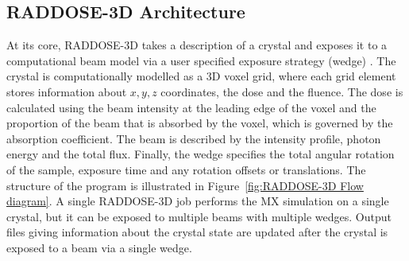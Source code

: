 \subsection{RADDOSE-3D Architecture}
\label{sub:RADDOSE-3D Architecture}
At its core, RADDOSE-3D takes a description of a crystal and exposes it to a computational beam model via a user specified exposure strategy (wedge) \cite{zeldin2013}.
The crystal is computationally modelled as a 3D voxel grid, where each grid element stores information about $x, y, z$ coordinates, the dose and the fluence.
The dose is calculated using the beam intensity at the leading edge of the voxel and the proportion of the beam that is absorbed by the voxel, which is governed by the absorption coefficient.
The beam is described by the intensity profile, photon energy and the total flux.
Finally, the wedge specifies the total angular rotation of the sample, exposure time and any rotation offsets or translations.
The structure of the program is illustrated in Figure~\ref{fig:RADDOSE-3D Flow diagram}.
A single RADDOSE-3D job performs the MX simulation on a single crystal, but it can be exposed to multiple beams with multiple wedges.
Output files giving information about the crystal state are updated after the crystal is exposed to a beam via a single wedge.
